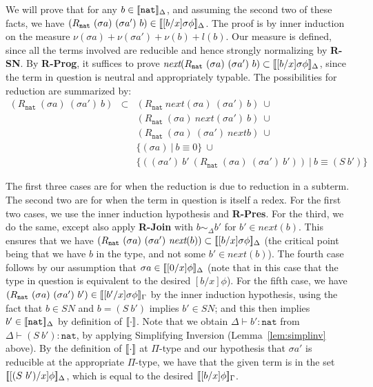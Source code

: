 \documentclass[copyright]{eptcs}
\newcommand{\next}[0]{\textit{next}}
\newcommand{\SN}[0]{\textit{SN}}
\newcommand{\nat}[0]{\texttt{nat}}
\newcommand{\interp}[1]{[\negthinspace[#1]\negthinspace]}
\begin{document}
\noindent We will prove that for any $b\in\interp{\nat}_\Delta$, and
assuming the second two of these facts, we have $(R_\nat\ (\sigma
a)\ (\sigma a')\ b) \in\interp{[b/x]\sigma\phi}_\Delta$. The proof is
by inner induction on the measure $\nu(\sigma a)+\nu(\sigma
a')+\nu(b)+l(b)$.  Our measure is defined, since all the terms
involved are reducible and hence strongly normalizing by
\textbf{R-SN}.  By \textbf{R-Prog}, it suffices to prove
$\next(R_\nat\ (\sigma a)\ (\sigma a')\ b)
\subset\interp{[b/x]\sigma\phi}_\Delta$, since the term in question is
neutral and appropriately typable.  The possibilities for reduction are
summarized by:
\[
\begin{array}{lll}
(R_\nat\ (\sigma a)\ (\sigma a')\ b) & \subset & (R_\nat\ \next(\sigma a)\ (\sigma a')\ b)\ \cup\\
\ &\ & (R_\nat\ (\sigma a)\ \next(\sigma a')\ b)\ \cup \\
\ &\ & (R_\nat\ (\sigma a)\ (\sigma a')\ \next b)\ \cup \\
\ &\ & \{ (\sigma a)\ |\ b \equiv 0 \}\ \cup \\
\ &\ & \{ ((\sigma a')\ b'\ (R_\nat\ (\sigma a)\ (\sigma a')\ b'))\ |\ b \equiv (S\ b')\}
\end{array}
\]

\noindent The first three cases are for when the reduction is due to
reduction in a subterm.  The second two are for when the term in
question is itself a redex.  For the first two cases, we use the inner
induction hypothesis and \textbf{R-Pres}.  For the third, we do the
same, except also apply \textbf{R-Join} with $b\sim_\Delta b'$ for
$b'\in\next(b)$.  This ensures that we have $(R_\nat\ (\sigma
a)\ (\sigma a')\ \next(b))\subset\interp{[b/x]\sigma\phi}_\Delta$ (the
critical point being that we have $b$ in the type, and not some
$b'\in\next(b)$).  The fourth case follows by our assumption that
$\sigma a\in\interp{[0/x]\phi}_\Delta$ (note that in this case that
the type in question is equivalent to the desired $[b/x]\phi$).  For
the fifth case, we have $(R_\nat\ (\sigma a)\ (\sigma
a')\ b')\in\interp{[b'/x]\sigma\phi}_\Gamma$ by the inner induction
hypothesis, using the fact that $b\in\SN$ and $b = (S\ b')$ implies
$b'\in\SN$; and this then implies $b'\in\interp{\nat}_\Delta$ by
definition of $\interp{\cdot}$.  Note that we obtain $\Delta\vdash
b':\nat$ from $\Delta \vdash (S\ b'):\nat$, by applying Simplifying
Inversion (Lemma~\ref{lem:simplinv} above).  By the definition of
$\interp{\cdot}$ at $\Pi$-type and our hypothesis that $\sigma a'$ is
reducible at the appropriate $\Pi$-type, we have that the given term
is in the set $\interp{[(S\ b')/x]\phi}_\Delta$, which is equal to the
desired $\interp{[b/x]\phi}_\Gamma$.
\end{document}
